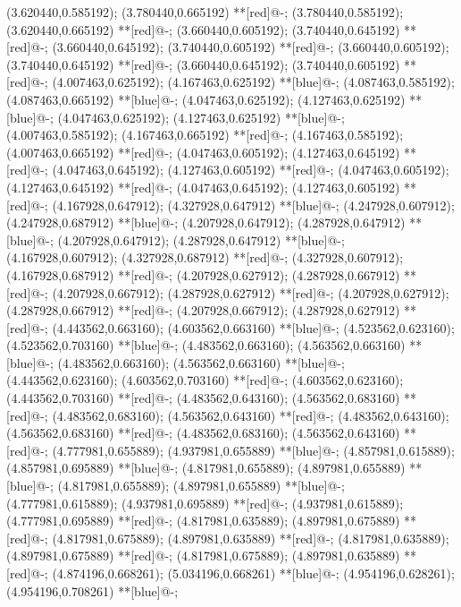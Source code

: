 (3.620440,0.585192); (3.780440,0.665192) **[red]@{-};
(3.780440,0.585192); (3.620440,0.665192) **[red]@{-};
(3.660440,0.605192); (3.740440,0.645192) **[red]@{-};
(3.660440,0.645192); (3.740440,0.605192) **[red]@{-};
(3.660440,0.605192); (3.740440,0.645192) **[red]@{-};
(3.660440,0.645192); (3.740440,0.605192) **[red]@{-};
(4.007463,0.625192); (4.167463,0.625192) **[blue]@{-};
(4.087463,0.585192); (4.087463,0.665192) **[blue]@{-};
(4.047463,0.625192); (4.127463,0.625192) **[blue]@{-};
(4.047463,0.625192); (4.127463,0.625192) **[blue]@{-};
(4.007463,0.585192); (4.167463,0.665192) **[red]@{-};
(4.167463,0.585192); (4.007463,0.665192) **[red]@{-};
(4.047463,0.605192); (4.127463,0.645192) **[red]@{-};
(4.047463,0.645192); (4.127463,0.605192) **[red]@{-};
(4.047463,0.605192); (4.127463,0.645192) **[red]@{-};
(4.047463,0.645192); (4.127463,0.605192) **[red]@{-};
(4.167928,0.647912); (4.327928,0.647912) **[blue]@{-};
(4.247928,0.607912); (4.247928,0.687912) **[blue]@{-};
(4.207928,0.647912); (4.287928,0.647912) **[blue]@{-};
(4.207928,0.647912); (4.287928,0.647912) **[blue]@{-};
(4.167928,0.607912); (4.327928,0.687912) **[red]@{-};
(4.327928,0.607912); (4.167928,0.687912) **[red]@{-};
(4.207928,0.627912); (4.287928,0.667912) **[red]@{-};
(4.207928,0.667912); (4.287928,0.627912) **[red]@{-};
(4.207928,0.627912); (4.287928,0.667912) **[red]@{-};
(4.207928,0.667912); (4.287928,0.627912) **[red]@{-};
(4.443562,0.663160); (4.603562,0.663160) **[blue]@{-};
(4.523562,0.623160); (4.523562,0.703160) **[blue]@{-};
(4.483562,0.663160); (4.563562,0.663160) **[blue]@{-};
(4.483562,0.663160); (4.563562,0.663160) **[blue]@{-};
(4.443562,0.623160); (4.603562,0.703160) **[red]@{-};
(4.603562,0.623160); (4.443562,0.703160) **[red]@{-};
(4.483562,0.643160); (4.563562,0.683160) **[red]@{-};
(4.483562,0.683160); (4.563562,0.643160) **[red]@{-};
(4.483562,0.643160); (4.563562,0.683160) **[red]@{-};
(4.483562,0.683160); (4.563562,0.643160) **[red]@{-};
(4.777981,0.655889); (4.937981,0.655889) **[blue]@{-};
(4.857981,0.615889); (4.857981,0.695889) **[blue]@{-};
(4.817981,0.655889); (4.897981,0.655889) **[blue]@{-};
(4.817981,0.655889); (4.897981,0.655889) **[blue]@{-};
(4.777981,0.615889); (4.937981,0.695889) **[red]@{-};
(4.937981,0.615889); (4.777981,0.695889) **[red]@{-};
(4.817981,0.635889); (4.897981,0.675889) **[red]@{-};
(4.817981,0.675889); (4.897981,0.635889) **[red]@{-};
(4.817981,0.635889); (4.897981,0.675889) **[red]@{-};
(4.817981,0.675889); (4.897981,0.635889) **[red]@{-};
(4.874196,0.668261); (5.034196,0.668261) **[blue]@{-};
(4.954196,0.628261); (4.954196,0.708261) **[blue]@{-};
